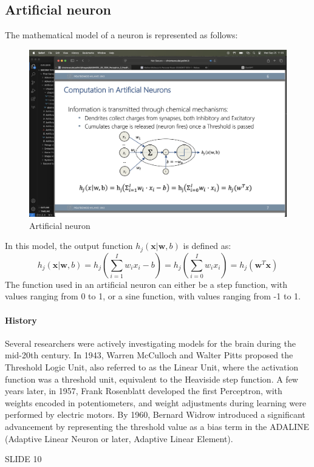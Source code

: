 \subsection{Artificial neuron}
The mathematical model of a neuron is represented as follows:
\begin{figure}[H]
    \centering
    \includegraphics[width=0.75\linewidth]{images/neuron.png}
    \caption{Artificial neuron}
\end{figure}
In this model, the output function $h_j(\mathbf{x}|\mathbf{w},b)$ is defined as:
\[h_j(\mathbf{x}|\mathbf{w},b)=h_j\left(\sum_{i=1}^Iw_ix_i-b\right)=h_j\left(\sum_{i=0}^Iw_ix_i\right)=h_j\left(\mathbf{w}^T\mathbf{x}\right)\]
The function used in an artificial neuron can either be a step function, with values ranging from 0 to 1, or a sine function, with values ranging from -1 to 1.

\paragraph*{History}
Several researchers were actively investigating models for the brain during the mid-20th century. 
In 1943, Warren McCulloch and Walter Pitts proposed the Threshold Logic Unit, also referred to as the Linear Unit, where the activation function was a threshold unit, equivalent to the Heaviside step function. 
A few years later, in 1957, Frank Rosenblatt developed the first Perceptron, with weights encoded in potentiometers, and weight adjustments during learning were performed by electric motors. 
By 1960, Bernard Widrow introduced a significant advancement by representing the threshold value as a bias term in the ADALINE (Adaptive Linear Neuron or later, Adaptive Linear Element). 

\begin{example}
    SLIDE 10
\end{example}

